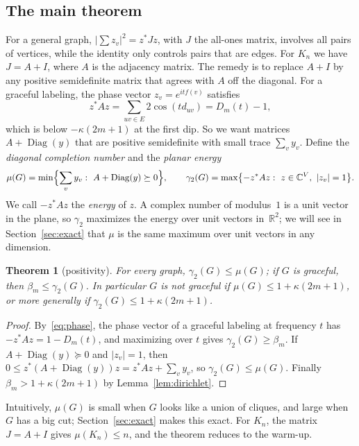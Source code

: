 \documentclass[11pt]{amsart}
\theoremstyle{tplain}
\newtheorem{theorem}{Theorem}[section]
\theoremstyle{tdefinition}
\theoremstyle{tremark}
\newcommand{\Diag}{\operatorname{Diag}}
\begin{document}
\subsection{The main theorem}

For a general graph, $|\sum z_v|^2=z^*Jz$, with $J$ the all-ones matrix,
involves all pairs of vertices, while the identity only controls pairs that
are edges. For $K_n$ we have $J=A+I$, where $A$ is the adjacency matrix. The
remedy is to replace $A+I$ by any positive semidefinite matrix that agrees
with $A$ off the diagonal. For a graceful labeling, the phase vector $z_v=e^{itf(v)}$ satisfies
\begin{equation}\label{eq:phase}
  z^*Az=\sum_{uv\in E}2\cos(td_{uv})=D_m(t)-1 ,
\end{equation}
which is below $-\kappa(2m+1)$ at the first dip. So we want matrices $A+\Diag(y)$
that are positive semidefinite with small trace $\sum_vy_v$. Define the
\emph{diagonal completion number} and the \emph{planar energy}
\[
  \mu(G)=\min\Bigl\{\sum_vy_v:\ A+\Diag(y)\succeq0\Bigr\},\qquad
  \gamma_2(G)=\max\bigl\{-z^*Az:\ z\in\mathbb C^{V},\ |z_v|=1\bigr\}.
\]
We call $-z^*Az$ the \emph{energy} of $z$. A complex number of modulus~$1$ is
a unit vector in the plane, so $\gamma_2$ maximizes the energy over unit
vectors in~$\mathbb R^2$; we will see in Section~\ref{sec:exact} that $\mu$ is
the same maximum over unit vectors in any dimension.

\begin{theorem}[positivity]\label{thm:P}
For every graph, $\gamma_2(G)\le\mu(G)$; if $G$ is graceful, then
$\beta_m\le\gamma_2(G)$. In particular $G$ is not graceful if
$\mu(G)\le1+\kappa(2m+1)$, or more generally if $\gamma_2(G)\le1+\kappa(2m+1)$.
\end{theorem}

\begin{proof}
By~\eqref{eq:phase}, the phase vector of a graceful labeling at frequency $t$
has
$-z^*Az=1-D_m(t)$, and maximizing over $t$ gives
$\gamma_2(G)\ge\beta_m$. If $A+\Diag(y)\succeq0$ and $|z_v|=1$, then
$0\le z^*(A+\Diag(y))z=z^*Az+\sum_vy_v$, so $\gamma_2(G)\le\mu(G)$. Finally
$\beta_m>1+\kappa(2m+1)$ by Lemma~\ref{lem:dirichlet}.
\end{proof}

Intuitively, $\mu(G)$ is small when $G$ looks like a union of cliques, and
large when $G$ has a big cut; Section~\ref{sec:exact} makes this exact. For
$K_n$, the matrix $J=A+I$ gives $\mu(K_n)\le n$, and the theorem reduces to the
warm-up.
\end{document}
